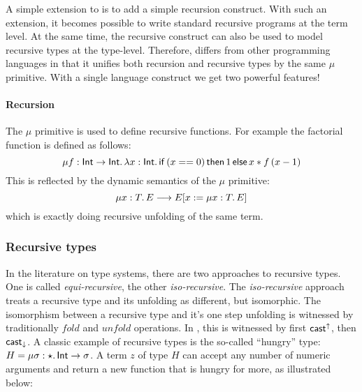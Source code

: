 A simple extension to \name is to add a simple recursion construct.
With such an extension, it becomes possible to write standard
recursive programs at the term level. At the same time, the recursive
construct can also be used to model recursive types at the type-level.
Therefore, \name differs from other programming languages in that it
unifies both recursion and recursive types by the same $\mu$
primitive. With a single language construct we get two powerful
features!

\paragraph{Recursion}

The $\mu$ primitive is used to define recursive functions.
For example the factorial function is defined as follows: 
\[\mu f:\mathsf{Int} \rightarrow
  \mathsf{Int}.\,\lambda x:\mathsf{Int}.\,\mathsf{if}\,(x ==
    0)\,\mathsf{then}\,1\,\mathsf{else}\,x * f\,(x - 1)\] 
This is reflected by the dynamic semantics of the $\mu$ primitive:
\[\mu x:T.\,E \longrightarrow E[x:=\mu x:T.\,E]\]
which is exactly doing recursive unfolding of the same term.


\subsubsection{Recursive types}
In the literature on type systems, there are two approaches to
recursive types. One is called \emph{equi-recursive}, the other
\emph{iso-recursive}. The \emph{iso-recursive}
approach treats a recursive type and its unfolding as different, but
isomorphic. The isomorphism between a recursive type and it's one step 
unfolding is witnessed by traditionally $fold$ and $unfold$
operations.
In \name, this is witnessed by first $ \mathsf{cast}^{\uparrow} $, then
$ \mathsf{cast}_{\downarrow} $. A classic example of recursive types is the so-called
``hungry'' type: $H = \mu \sigma:\star.\,\mathsf{Int} \rightarrow
  \sigma$. A term $z$ of type $H$ can accept any number of numeric
arguments and return a new function that is hungry for more, as
illustrated below:

